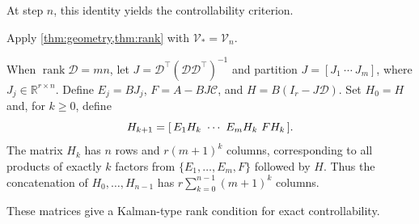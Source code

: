 \documentclass[twocolumn]{autart}
\newcounter{part}
\begin{document}
At step $n$, this identity yields the controllability criterion.

\vspace{-2mm}
\begin{pf}
Apply \cref{thm:geometry,thm:rank} with $\mathcal V_*=\mathcal V_n$.
\end{pf}
 \vspace{-2mm}
When $\operatorname{rank}\mathcal D=mn$, let
$J=\mathcal D^\top(\mathcal D\mathcal D^\top)^{-1}$ and partition
$J=[J_1\ \cdots\ J_m]$, where $J_j\in\mathbb R^{r\times n}$. Define
$E_j=BJ_j$, $F=A-BJ\mathcal C$, and $H=B(I_r-J\mathcal D)$.
Set $H_0=H$ and, for $k\geq0$, define\vspace{-2mm}
\begin{equation}\label{eq:word-blocks}
H_{k+1}=[\,E_1H_k\ \cdots\ E_mH_k\ FH_k\,].\vspace{-2mm}
\end{equation}
The matrix $H_k$ has $n$ rows and $r(m+1)^k$ columns, corresponding
to all products of exactly $k$ factors from $\{E_1,\dots,E_m,F\}$
followed by $H$. Thus the concatenation of $H_0,\dots,H_{n-1}$ has
$r\sum\limits_{k=0}^{n-1}(m+1)^k$ columns.

These matrices give a Kalman-type rank condition for exact controllability.

\end{document}
